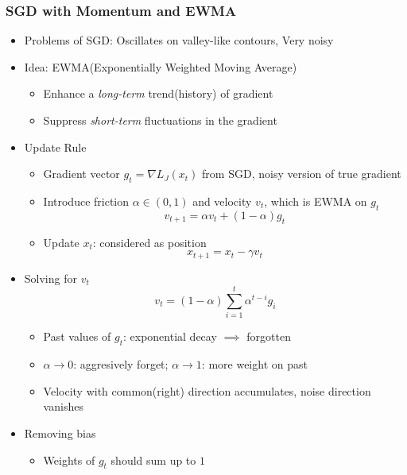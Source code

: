 \subsubsection*{SGD with Momentum and EWMA}
\begin{itemize}
    \item Problems of SGD: Oscillates on valley-like contours, Very noisy
    \item Idea: EWMA(Exponentially Weighted Moving Average)
    \begin{itemize}
        \item Enhance a \textit{long-term} trend(history) of gradient
        \item Suppress \textit{short-term} fluctuations in the gradient
    \end{itemize}
    \clearpage
    \item Update Rule
    \begin{itemize}
        \item Gradient vector $g_t=\nabla L_J(x_t)$ from SGD, noisy version of true gradient
        \item Introduce friction $\alpha\in(0,1)$ and velocity $v_t$, which is EWMA on $g_t$
        \begin{equation}
            v_{t+1}=\alpha v_t+(1-\alpha)g_t
        \end{equation}
        \item Update $x_t$: considered as position
        \begin{equation}
            x_{t+1}=x_t-\gamma v_t
        \end{equation}
    \end{itemize}
    \item Solving for $v_t$
    \begin{equation}\label{eq:dl:ewma-solution}
        v_t=(1-\alpha)\sum_{i=1}^t\alpha^{t-i}g_i
    \end{equation}
    \begin{itemize}
        \item Past values of $g_t$: exponential decay $\implies$ forgotten
        \item $\alpha\to0$: aggresively forget; $\alpha\to1$: more weight on past
        \item Velocity with common(right) direction accumulates, noise direction vanishes
    \end{itemize}
    \item Removing bias
    \begin{itemize}
        \item Weights of $g_t$ should sum up to $1$

\end{itemize}
\end{itemize}
